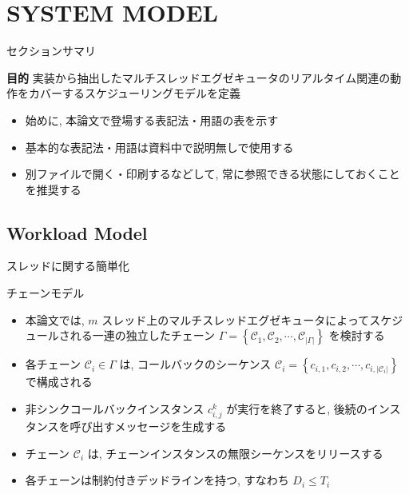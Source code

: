 
\section{SYSTEM MODEL}
\label{sec: system_model}

\begin{frame}{セクションサマリ}
    \begin{itembox}[l]{\textbf{目的}}
        実装から抽出したマルチスレッドエグゼキュータのリアルタイム関連の動作をカバーするスケジューリングモデルを定義
    \end{itembox}
\end{frame}

\begin{frame}{}
    \begin{itemize}
        \item 始めに, 本論文で登場する表記法・用語の表を示す
        \item 基本的な表記法・用語は資料中で説明無しで使用する
        \item 別ファイルで開く・印刷するなどして, 常に参照できる状態にしておくことを推奨する
    \end{itemize}
\end{frame}



\subsection{Workload Model}
\label{ssec: workload_model}

\begin{frame}{スレッドに関する簡単化}
\end{frame}

\begin{frame}{チェーンモデル}
    \begin{itemize}
        \item 本論文では, $m$ スレッド上のマルチスレッドエグゼキュータによってスケジュールされる一連の独立したチェーン $\Gamma=\left\{\mathcal{C}_{1}, \mathcal{C}_{2}, \cdots, \mathcal{C}_{|\Gamma|}\right\}$ を検討する
        \item 各チェーン $\mathcal{C}_{i} \in \Gamma$ は, コールバックのシーケンス $\mathcal{C}_{i}=\left\{c_{i, 1}, c_{i, 2}, \cdots, c_{i,\left|\mathcal{C}_{i}\right|}\right\}$ で構成される
        \item 非シンクコールバックインスタンス $c_{i, j}^{k}$ が実行を終了すると, 後続のインスタンスを呼び出すメッセージを生成する
        \item チェーン $\mathcal{C}_{i}$ は, チェーンインスタンスの無限シーケンスをリリースする
        \item 各チェーンは制約付きデッドラインを持つ, すなわち $D_{i} \leq T_{i}$
    \end{itemize}
\end{frame}

